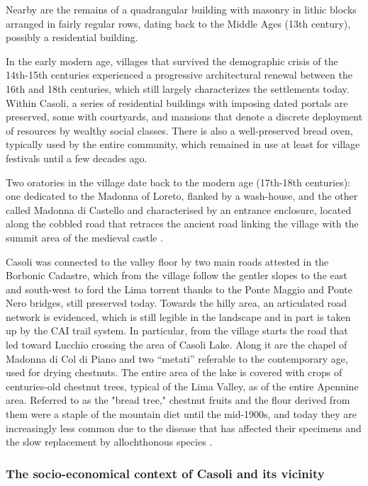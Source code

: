 \documentclass[sustainability,article,submit,pdftex,moreauthors]{Definitions/mdpi}
\begin{document}
Nearby are the remains of a quadrangular building with masonry in lithic blocks arranged in fairly regular rows, dating back to the Middle Ages (13th century), possibly a residential building.

In the early modern age, villages that survived the demographic crisis of the 14th-15th centuries experienced a progressive architectural renewal between the 16th and 18th centuries, which still largely characterizes the settlements today. Within Casoli, a series of residential buildings with imposing dated portals are preserved, some with courtyards, and mansions that denote a discrete deployment of resources by wealthy social classes. There is also a well-preserved bread oven, typically used by the entire community, which remained in use at least for village festivals until a few decades ago.

Two oratories in the village date back to the modern age (17th-18th centuries): one dedicated to the Madonna of Loreto, flanked by a wash-house, and the other called Madonna di Castello and characterised by an entrance enclosure, located along the cobbled road that retraces the ancient road linking the village with the summit area of the medieval castle \cite{gia96}.

Casoli was connected to the valley floor by two main roads attested in the Borbonic Cadastre, which from the village follow the gentler slopes to the east and south-west to ford the Lima torrent thanks to the Ponte Maggio and Ponte Nero bridges, still preserved today. Towards the hilly area, an articulated road network is evidenced, which is still legible in the landscape and in part is taken up by the CAI trail system. In particular, from the village starts the road that led toward Lucchio crossing the area of Casoli Lake. Along it are the chapel of Madonna di Col di Piano and two “metati” referable to the contemporary age, used for drying chestnuts. The entire area of the lake is covered with crops of centuries-old chestnut trees, typical of the Lima Valley, as of the entire Apennine area. Referred to as the "bread tree," chestnut fruits and the flour derived from them were a staple of the mountain diet until the mid-1900s, and today they are increasingly less common due to the disease that has affected their specimens and the slow replacement by allochthonous species \cite{buc92, puc10}.

\subsubsection{The socio-economical context of Casoli and its vicinity}
\end{document}
